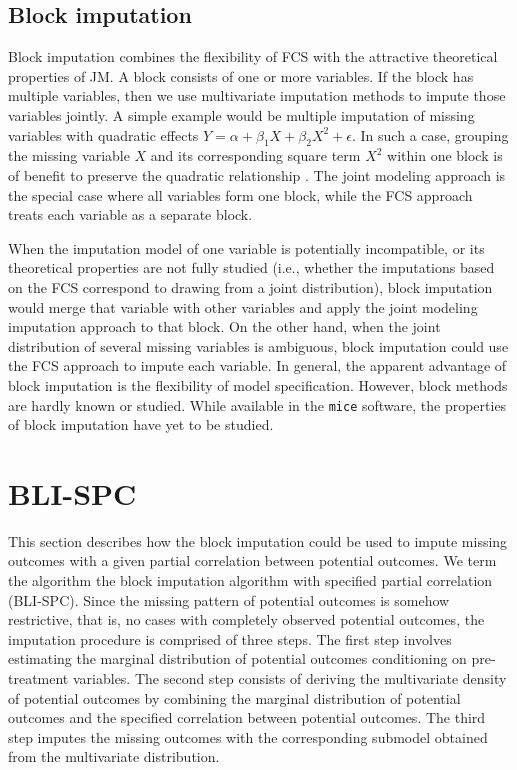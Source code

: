 	\subsection{Block imputation}
	Block imputation combines the flexibility of FCS with the attractive theoretical properties of JM. A block consists of one or more variables. If the block has multiple variables, then we use multivariate imputation methods to impute those variables jointly. A simple example would be multiple imputation of missing variables with quadratic effects $Y = \alpha + \beta_{1}X + \beta_{2}X^2 + \epsilon$. In such a case, grouping the missing variable $X$ and its corresponding square term $X^2$ within one block is of benefit to preserve the quadratic relationship \citep{vink2019}. The joint modeling approach is the special case where all variables form one block, while the FCS approach treats each variable as a separate block. 
	
	When the imputation model of one variable is potentially incompatible, or its theoretical properties are not fully studied (i.e., whether the imputations based on the FCS correspond to drawing from a joint distribution), block imputation would merge that variable with other variables and apply the joint modeling imputation approach to that block. On the other hand, when the joint distribution of several missing variables is ambiguous, block imputation could use the FCS approach to impute each variable. In general, the apparent advantage of block imputation is the flexibility of model specification. However, block methods are hardly known or studied. While available in the \texttt{mice} software, the properties of block imputation have yet to be studied. 
	
	\section{BLI-SPC}
	\label{sec:4.4}
	This section describes how the block imputation could be used to impute missing outcomes with a given partial correlation between potential outcomes. We term the algorithm the block imputation algorithm with specified partial correlation (BLI-SPC). Since the missing pattern of potential outcomes is somehow restrictive, that is, no cases with completely observed potential outcomes, the imputation procedure is comprised of three steps. The first step involves estimating the marginal distribution of potential outcomes conditioning on pre-treatment variables. The second step consists of deriving the multivariate density of potential outcomes by combining the marginal distribution of potential outcomes and the specified correlation between potential outcomes. The third step imputes the missing outcomes with the corresponding submodel obtained from the multivariate distribution. 
	
